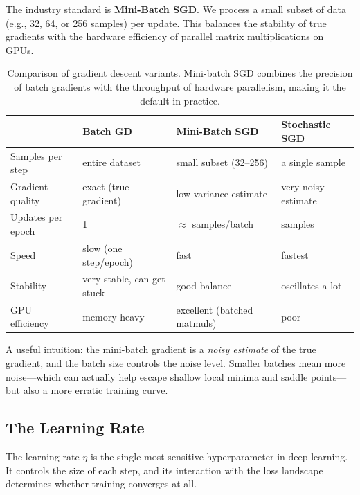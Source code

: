 \documentclass{tufte-handout}
\begin{document}
The industry standard is \textbf{Mini-Batch SGD}. We process a small subset of data (e.g., 32, 64, or 256 samples) per update. This balances the stability of true gradients with the hardware efficiency of parallel matrix multiplications on GPUs.

\begin{table}[htbp]
\centering
\small
\begin{tabularx}{\textwidth}{@{}>{\raggedright\arraybackslash}p{2.6cm}X X X@{}}
\toprule
 & \textbf{Batch GD} & \textbf{Mini-Batch SGD} & \textbf{Stochastic SGD} \\
\midrule
Samples per step & entire dataset & small subset (32--256) & a single sample \\
Gradient quality & exact (true gradient) & low-variance estimate & very noisy estimate \\
Updates per epoch & 1 & $\approx$ samples/batch & samples \\
Speed & slow (one step/epoch) & fast & fastest \\
Stability & very stable, can get stuck & good balance & oscillates a lot \\
GPU efficiency & memory-heavy & excellent (batched matmuls) & poor \\
\bottomrule
\end{tabularx}
\caption{Comparison of gradient descent variants. Mini-batch SGD combines the precision of batch gradients with the throughput of hardware parallelism, making it the default in practice.}
\label{tab:gd_variants}
\end{table}

A useful intuition: the mini-batch gradient is a \emph{noisy estimate} of the true gradient, and the batch size controls the noise level. Smaller batches mean more noise---which can actually help escape shallow local minima and saddle points---but also a more erratic training curve.

\subsection{The Learning Rate}

The learning rate $\eta$ is the single most sensitive hyperparameter in deep learning. It controls the size of each step, and its interaction with the loss landscape determines whether training converges at all.
\end{document}
